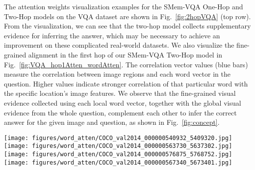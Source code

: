 The attention weights visualization examples for the SMem-VQA One-Hop and Two-Hop models on the VQA dataset are shown in Fig.~\ref{fig:2hopVQA} (top row). From the visualization, we can see that the two-hop model collects supplementary evidence for inferring the answer, which may be necessary to achieve an improvement on these complicated real-world datasets. We also visualize the fine-grained alignment in the first hop of our SMem-VQA Two-Hop model in Fig.~\ref{fig:VQA_hop1Atten_wordAtten}. 
The correlation vector values (blue bars) measure the correlation between image regions and each word vector in the question. Higher values indicate stronger correlation of that particular word with the specific location's image features. We observe that the fine-grained visual evidence collected using each local word vector, together with the global visual evidence from the whole question, complement each other to infer the correct answer for the given image and question, as shown in Fig.~\ref{fig:concept}.


\begin{figure*}[t]
  \texttt{[image: figures/word\_atten/COCO\_val2014\_000000540932\_5409320.jpg]}
  \texttt{[image: figures/word\_atten/COCO\_val2014\_000000563730\_5637302.jpg]}\\
  \texttt{[image: figures/word\_atten/COCO\_val2014\_000000576875\_5768752.jpg]}
  \texttt{[image: figures/word\_atten/COCO\_val2014\_000000567340\_5673401.jpg]}
\vspace{-0.3in}
\caption{
Visualization of the original image (left), the spatial attention weights $W_{att}$ in the first hop (middle) and one correlation vector from the correlation matrix $C$ for the location with highest attention weight in the SMem-VQA Two-Hop model on the VQA dataset.
Higher values in the correlation  vector indicate  stronger correlation of that word with the chosen location's image features.}
\label{fig:VQA_hop1Atten_wordAtten}
\vspace{-0.15in}
\end{figure*}




 





